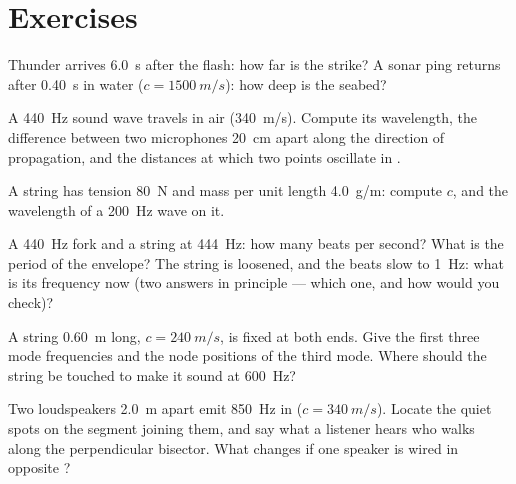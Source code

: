 \section{Exercises}

\begin{exercise}[$\star$]\label{exo:b1:wave-propagation:1}
Thunder arrives \qty{6.0}{s} after the flash: how far is the strike? A
sonar ping returns after \qty{0.40}{s} in water ($c = \qty{1500}{m/s}$):
how deep is the seabed?
\end{exercise}

\begin{exercise}[$\star$]\label{exo:b1:wave-propagation:2}
A \qty{440}{Hz} sound wave travels in air (\qty{340}{m/s}). Compute its
wavelength, the  difference between two microphones \qty{20}{cm}
apart along the direction of propagation, and the distances at which
two points oscillate in .
\end{exercise}

\begin{exercise}[$\star$]\label{exo:b1:wave-propagation:3}
A string has tension \qty{80}{N} and mass per unit length
\qty{4.0}{g/m}: compute $c$, and the wavelength of a \qty{200}{Hz}
wave on it.
\end{exercise}

\begin{exercise}[$\star$]\label{exo:b1:wave-propagation:4}
A \qty{440}{Hz} fork and a string at \qty{444}{Hz}: how many beats per
second? What is the period of the envelope? The string
is loosened, and the beats slow to \qty{1}{Hz}: what is its frequency
now (two answers in principle --- which one, and how would you check)?
\end{exercise}

\begin{exercise}[$\star\star$]\label{exo:b1:wave-propagation:5}
A string \qty{0.60}{m} long, $c = \qty{240}{m/s}$, is fixed at both
ends. Give the first three mode frequencies and the node positions of
the third mode. Where should the string be touched to make it sound at
\qty{600}{Hz}?
\end{exercise}

\begin{exercise}[$\star\star$]\label{exo:b1:wave-propagation:6}
Two loudspeakers \qty{2.0}{m} apart emit \qty{850}{Hz} in 
($c = \qty{340}{m/s}$). Locate the quiet spots on the segment joining
them, and say what a listener hears who walks along the perpendicular
bisector. What changes if one speaker is wired in opposite ?
\end{exercise}


